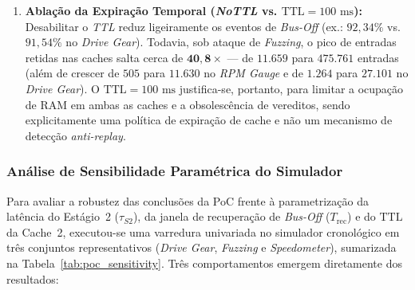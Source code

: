\documentclass[conference]{IEEEtran}
\begin{document}
\begin{enumerate}
    \item \textbf{Ablação da Expiração Temporal (\textit{NoTTL} vs. $\text{TTL}=100\text{ ms}$):} Desabilitar o \textit{TTL} reduz ligeiramente os eventos de \textit{Bus-Off} (ex.: $92{,}34\%$ vs. $91{,}54\%$ no \textit{Drive Gear}). Todavia, sob ataque de \textit{Fuzzing}, o pico de entradas retidas nas caches salta cerca de $\mathbf{40{,}8\times}$ — de $11.659$ para $475.761$ entradas (além de crescer de $505$ para $11.630$ no \textit{RPM Gauge} e de $1.264$ para $27.101$ no \textit{Drive Gear}). O $\text{TTL}=100\text{ ms}$ justifica-se, portanto, para limitar a ocupação de RAM em ambas as caches e a obsolescência de vereditos, sendo explicitamente uma política de expiração de cache e não um mecanismo de detecção \textit{anti-replay}.
\end{enumerate}

\subsubsection{Análise de Sensibilidade Paramétrica do Simulador}
Para avaliar a robustez das conclusões da PoC frente à parametrização da latência do Estágio~2 ($\tau_{S2}$), da janela de recuperação de \textit{Bus-Off} ($T_{\text{rec}}$) e do $\text{TTL}$ da Cache~2, executou-se uma varredura univariada no simulador cronológico em três conjuntos representativos (\textit{Drive Gear}, \textit{Fuzzing} e \textit{Speedometer}), sumarizada na Tabela~\ref{tab:poc_sensitivity}. Três comportamentos emergem diretamente dos resultados:
\end{document}
